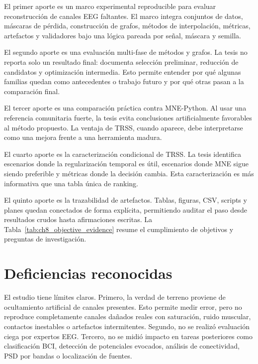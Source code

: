 El primer aporte es un marco experimental reproducible para evaluar reconstrucción de canales EEG faltantes. El marco integra conjuntos de datos, máscaras de pérdida, construcción de grafos, métodos de interpolación, métricas, artefactos y validadores bajo una lógica pareada por señal, máscara y semilla.

El segundo aporte es una evaluación multi-fase de métodos y grafos. La tesis no reporta solo un resultado final: documenta selección preliminar, reducción de candidatos y optimización intermedia. Esto permite entender por qué algunas familias quedan como antecedentes o trabajo futuro y por qué otras pasan a la comparación final.

El tercer aporte es una comparación práctica contra MNE-Python. Al usar una referencia comunitaria fuerte, la tesis evita conclusiones artificialmente favorables al método propuesto. La ventaja de TRSS, cuando aparece, debe interpretarse como una mejora frente a una herramienta madura.

El cuarto aporte es la caracterización condicional de TRSS. La tesis identifica escenarios donde la regularización temporal es útil, escenarios donde MNE sigue siendo preferible y métricas donde la decisión cambia. Esta caracterización es más informativa que una tabla única de ranking.

El quinto aporte es la trazabilidad de artefactos. Tablas, figuras, CSV, scripts y planes quedan conectados de forma explícita, permitiendo auditar el paso desde resultados crudos hasta afirmaciones escritas. La Tabla~\ref{tab:ch8_objective_evidence} resume el cumplimiento de objetivos y preguntas de investigación.



\section{Deficiencias reconocidas}

El estudio tiene límites claros. Primero, la verdad de terreno proviene de ocultamiento artificial de canales presentes. Esto permite medir error, pero no reproduce completamente canales dañados reales con saturación, ruido muscular, contactos inestables o artefactos intermitentes. Segundo, no se realizó evaluación ciega por expertos EEG. Tercero, no se midió impacto en tareas posteriores como clasificación BCI, detección de potenciales evocados, análisis de conectividad, PSD por bandas o localización de fuentes.

